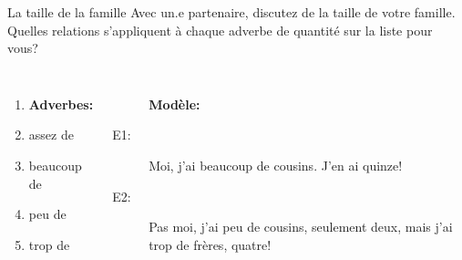 \begin{frame}{La taille de la famille}
  Avec un.e partenaire, discutez de la taille  de votre famille.
  Quelles relations s'appliquent à chaque adverbe de quantité sur la liste pour vous?
  \begin{columns}
      \begin{enumerate}
        \item[] \textbf{Adverbes:}
        \item assez de
        \item beaucoup de
        \item peu de
        \item trop de
      \end{enumerate}
      \begin{description}
        \item[] \textbf{Modèle:}
        \item[E1:] Moi, j'ai \alert{beaucoup de} cousins. J'en ai quinze!
        \item[E2:] Pas moi, j'ai \alert{peu de} cousins, seulement deux, mais j'ai \alert{trop de} frères, quatre!
      \end{description}
  \end{columns}
\end{frame}